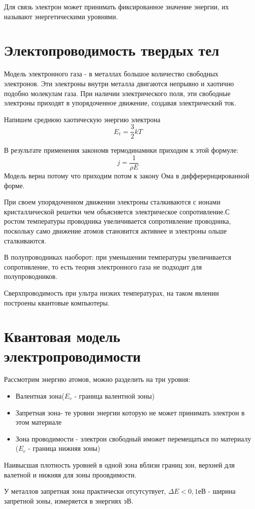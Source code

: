 \documentclass[../main.tex]{subfiles}
\begin{document}
Для связь электрон может принимать фиксированное значение энергии, их называют энергетическими уровнями.

\section{Электопроводимость твердых тел}
Модель электронного газа - в металлах большое количество свободных электронов. Эти электроны внутри металла двигаются непрывно и хаотично подобно молекулам газа.
При наличии электрического поля, эти свободные электроны приходят в упорядоченное движение, создавая электрический ток.

Напишем среднюю хаотическую энергию электрона
\[E_t = \frac{3}{2} kT\]

В результате применения закономв термодинамики приходим к этой формуле:
\[j = \frac{1}{\rho E}\]
Модель верна потому что приходим потом к закону Ома в дифферернцированной форме.

При своем упорядоченном движении электроны сталкиваются с ионами кристаллической решетки чем объясняется электрическое сопротивление.С ростом
температуры проводника увеличивается сопротивление проводника, поскольку само движение атомов становится активнее и электроны ольше сталкиваются.

В полупроводниках наоборот: при уменьшении температуры увеличивается сопротивление, то есть теория электронного газа не подходит для полупроводников.

Сверхпроводимость при ультра низких температурах, на таком явлении построены квантовые компьютеры.
\section{Квантовая модель электропроводимости}
Рассмотрим энергию атомов, можно разделить на три уровня:
\begin{itemize}
    \item Валентная зона($E_v$ - граница валентной зоны)
    \item Запретная зона- те уровни энергии которую не может принимать электрон в этом материале
    \item Зона проводимости - электрон свободный  иможет перемещаться по материалу ($E_c$ - граница нижняя зоны)
\end{itemize}

Наивысшая плотность уровней в одной зона вблизи границ зон, верхней для валетной и нижняя для зоны проовдимости.

У металлов запретная зона практически отсутсутвует, $\Delta E < 0,1 $еВ - ширина запретной зоны, измеряется в энергиях эВ.
\end{document}
